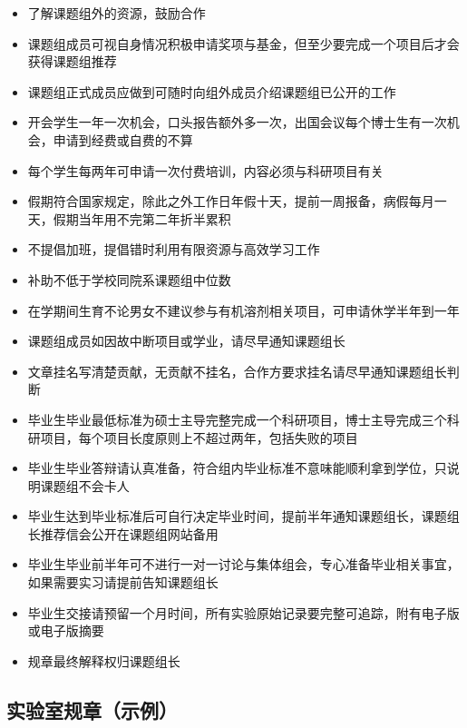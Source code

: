 \documentclass[]{tufte-book}
\begin{document}
\begin{itemize}
\item
  了解课题组外的资源，鼓励合作
\item
  课题组成员可视自身情况积极申请奖项与基金，但至少要完成一个项目后才会获得课题组推荐
\item
  课题组正式成员应做到可随时向组外成员介绍课题组已公开的工作
\item
  开会学生一年一次机会，口头报告额外多一次，出国会议每个博士生有一次机会，申请到经费或自费的不算
\item
  每个学生每两年可申请一次付费培训，内容必须与科研项目有关
\item
  假期符合国家规定，除此之外工作日年假十天，提前一周报备，病假每月一天，假期当年用不完第二年折半累积
\item
  不提倡加班，提倡错时利用有限资源与高效学习工作
\item
  补助不低于学校同院系课题组中位数
\item
  在学期间生育不论男女不建议参与有机溶剂相关项目，可申请休学半年到一年
\item
  课题组成员如因故中断项目或学业，请尽早通知课题组长
\item
  文章挂名写清楚贡献，无贡献不挂名，合作方要求挂名请尽早通知课题组长判断
\item
  毕业生毕业最低标准为硕士主导完整完成一个科研项目，博士主导完成三个科研项目，每个项目长度原则上不超过两年，包括失败的项目
\item
  毕业生毕业答辩请认真准备，符合组内毕业标准不意味能顺利拿到学位，只说明课题组不会卡人
\item
  毕业生达到毕业标准后可自行决定毕业时间，提前半年通知课题组长，课题组长推荐信会公开在课题组网站备用
\item
  毕业生毕业前半年可不进行一对一讨论与集体组会，专心准备毕业相关事宜，如果需要实习请提前告知课题组长
\item
  毕业生交接请预留一个月时间，所有实验原始记录要完整可追踪，附有电子版或电子版摘要
\item
  规章最终解释权归课题组长
\end{itemize}

\hypertarget{ux5b9eux9a8cux5ba4ux89c4ux7ae0ux793aux4f8b}{%
\subsection{实验室规章（示例）}\label{ux5b9eux9a8cux5ba4ux89c4ux7ae0ux793aux4f8b}}
\end{document}
